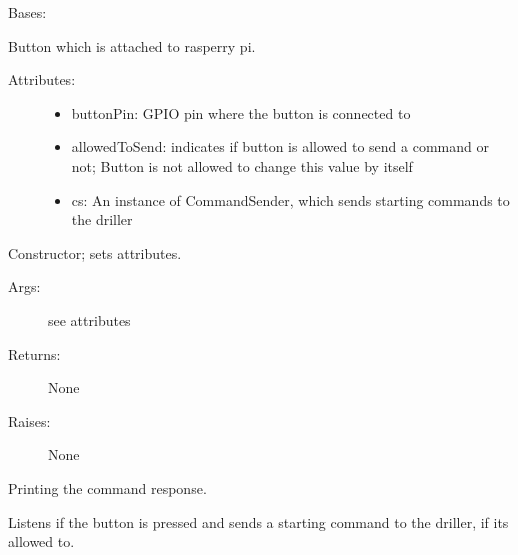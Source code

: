 \documentclass[letterpaper,10pt,english]{sphinxmanual}
\begin{document}
\begin{fulllineitems}
\label{button:button.Button}
Bases: 

Button which is attached to rasperry pi.
\begin{description}
\item[{Attributes:}] \leavevmode\begin{itemize}
\item {} 
buttonPin: GPIO pin where the button is connected to

\item {} 
allowedToSend: indicates if button is allowed to send a command or not; Button is not allowed to change this value by itself

\item {} 
cs: An instance of CommandSender, which sends starting commands to the driller

\end{itemize}

\end{description}

\begin{fulllineitems}
\label{button:button.Button.__init__}
Constructor; sets attributes.
\begin{description}
\item[{Args:}] \leavevmode
see attributes

\item[{Returns:}] \leavevmode
None

\item[{Raises:}] \leavevmode
None

\end{description}

\end{fulllineitems}


\begin{fulllineitems}
\label{button:button.Button.onResponse}
Printing the command response.

\end{fulllineitems}


\begin{fulllineitems}
\label{button:button.Button.start}
Listens if the button is pressed and sends a starting command to the driller,
if its allowed to.

\end{fulllineitems}


\end{fulllineitems}
\end{document}
